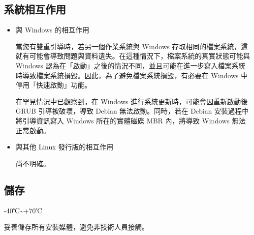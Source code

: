 \documentclass{article}
\begin{document}
\begin{multicols*}{3}


	 
	 


	\begin{tcolorbox}
	\section*{系統相互作用}
	\end{tcolorbox}
	\begin{itemize}[leftmargin=*]
		\setlength{\parindent}{0pt}

		\item 與 Windows 的相互作用

		當您有雙重引導時，若另一個作業系統與 Windows 存取相同的檔案系統，這就有可能會導致問題與資料遺失。在這種情況下，檔案系統的真實狀態可能與 Windows 認為在「啟動」之後的情況不同，並且可能在進一步寫入檔案系統時導致檔案系統損毀。因此，為了避免檔案系統損毀，有必要在 Windows 中停用「快速啟動」功能。

		在罕見情況中已觀察到，在 Windows 進行系統更新時，可能會因重新啟動後 GRUB 引導被破壞，導致 Debian 無法啟動。同時，若在 Debian 安裝過程中將引導資訊寫入 Windows 所在的實體磁碟 MBR 內，將導致 Windows 無法正常啟動。

		\item 與其他 Linux 發行版的相互作用

		尚不明確。

	\end{itemize}


	\begin{tcolorbox}
	\section*{儲存}
	\end{tcolorbox}

	-40℃\textasciitilde +70℃

	妥善儲存所有安裝媒體，避免非技術人員接觸。


\end{multicols*}
\end{document}
